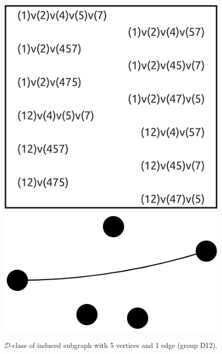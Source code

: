 \begin{appendices}
\begin{figure}[H]
\includegraphics[scale=0.09]{images/x9/x9_5v_1e.png}
\includegraphics[scale=0.1]{images/x9/x9_5v_1e_vis.png}
\caption{$\mathcal{D}$-class of induced subgraph with 5 vertices and 1 edge (group D12).}
\end{figure}


\end{appendices}
